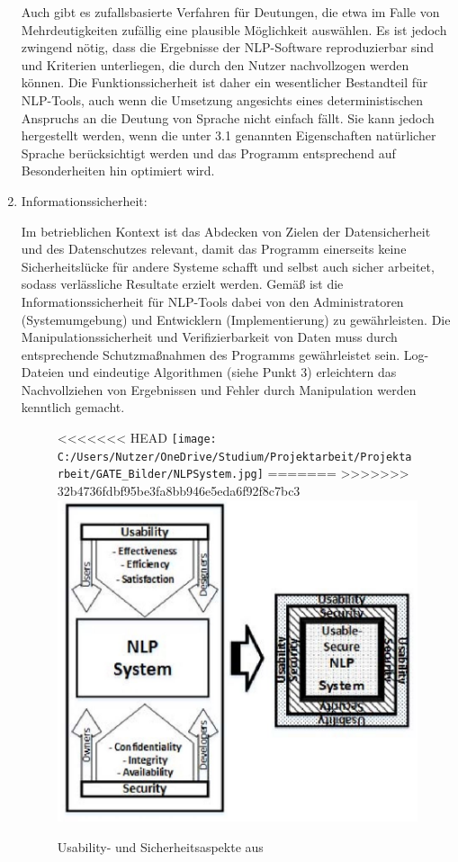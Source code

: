 \documentclass[12pt]{report}
\begin{document}
\begin{enumerate}
Auch gibt es zufallsbasierte Verfahren für Deutungen, die etwa im Falle von Mehrdeutigkeiten zufällig eine plausible Möglichkeit auswählen. Es ist jedoch zwingend nötig, dass die Ergebnisse der NLP-Software reproduzierbar sind und Kriterien unterliegen, die durch den Nutzer nachvollzogen werden können. Die Funktionssicherheit ist daher ein wesentlicher Bestandteil für NLP-Tools, auch wenn die Umsetzung angesichts eines deterministischen Anspruchs an die Deutung von Sprache nicht einfach fällt. Sie kann jedoch hergestellt werden, wenn die unter 3.1 genannten Eigenschaften natürlicher Sprache berücksichtigt werden und das Programm entsprechend auf Besonderheiten hin optimiert wird.

\item Informationssicherheit:

Im betrieblichen Kontext ist das Abdecken von Zielen der Datensicherheit und des Datenschutzes relevant, damit das Programm einerseits keine Sicherheitslücke für andere Systeme schafft und selbst auch sicher arbeitet, sodass verlässliche Resultate erzielt werden. Gemäß \cite{hl13} ist die Informationssicherheit für NLP-Tools dabei von den Administratoren (Systemumgebung) und Entwicklern (Implementierung) zu gewährleisten. Die Manipulationssicherheit und Verifizierbarkeit von Daten muss durch entsprechende Schutzmaßnahmen des Programms gewährleistet sein. Log-Dateien und eindeutige Algorithmen (siehe Punkt 3) erleichtern das Nachvollziehen von Ergebnissen und Fehler durch Manipulation werden kenntlich gemacht. 

\begin{figure}[h!]
\begin{center}
<<<<<<< HEAD
\texttt{[image: C:/Users/Nutzer/OneDrive/Studium/Projektarbeit/Projektarbeit/GATE\_Bilder/NLPSystem.jpg]}
=======
>>>>>>> 32b4736fdbf95be3fa8bb946e5eda6f92f8c7bc3
\includegraphics[scale=0.5]{GATE_Bilder/NLPSystem.jpg}
\caption{Usability- und Sicherheitsaspekte aus \cite{hl13}}
\end{center}
\end{figure} 


\end{enumerate}
\end{document}
